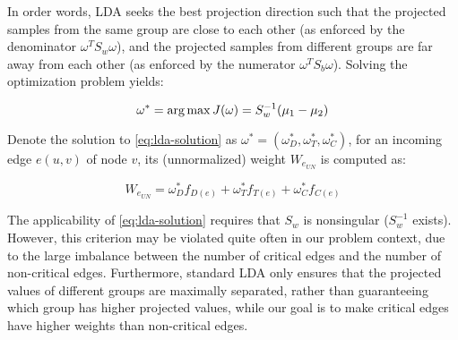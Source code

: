 In order words, LDA seeks the best projection direction such that the projected samples from the same group are close to each other (as enforced by the denominator $\omega^TS_w\omega$), and the projected samples from different groups are far away from each other (as enforced by the numerator $\omega^TS_b\omega$). Solving the optimization problem yields:

\vspace*{-2ex}
\begin{equation}
    \label{eq:lda-solution}
    \omega^* = \operatorname*{arg\,max} J(\omega) = S_w^{-1}(\mu_1-\mu_2)
\end{equation}

Denote the 
solution to \cref{eq:lda-solution} as $\omega^{*} = (\omega^{*}_{D}, \omega^{*}_{T}, \omega^{*}_{C})$, for an incoming edge $e(u,v)$ of node $v$, its (unnormalized) weight $W_{e_{UN}}$ is computed as:

\vspace*{-2ex}
\begin{equation}
    \label{eq:projection}
    W_{e_{UN}} = \omega^{*}_{D} f_{D(e)} + \omega^{*}_{T} f_{T(e)} + \omega^{*}_{C} f_{C(e)}
\end{equation}

The applicability of \cref{eq:lda-solution} 
requires that $S_w$ is nonsingular (\ie $S_w^{-1}$ exists).
However, this criterion may be violated quite often in our problem context, due to the large imbalance between the number of critical edges and the number of non-critical edges.
Furthermore, standard LDA only ensures that the projected values of different groups are maximally separated, rather than guaranteeing which group has higher projected values, while our goal is to make critical edges have higher weights than non-critical edges.



